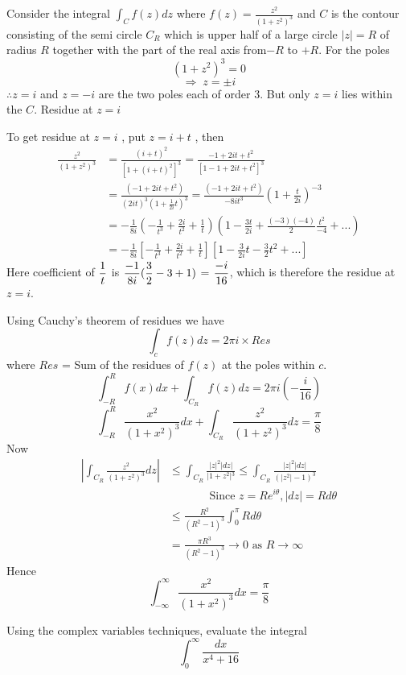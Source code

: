 \begin{solution}
Consider the integral $\int_{C}f(z)dz$ where $f(z)=\frac{z^{2}}{(1+z^{2})^{3}}$
and $C$ is the contour consisting of the semi circle $C_{R}$ which
is upper half of a large circle $|z|=R$ of radius $R$ together with
the part of the real axis from$-R$ to $+R$. For the poles 
\[(1+z^{2})^{3}=0\]
\[\Rightarrow\; z=\pm i\]
$\therefore z=i$ and $z=-i$ are the two poles each of order 3. But
only $z=i$ lies within the $C$. Residue at $z=i$

To get residue at $z=i$ , put $z=i+t$ , then 
\begin{align*}
\frac{z^{2}}{(1+z^{2})^{3}} & =\frac{(i+t)^{2}}{[1+(i+t)^{2}]^{3}}=\frac{-1+2it+t^{2}}{[1-1+2it+t^{2}]^{3}}\\
 & =\frac{(-1+2it+t^{2})}{(2it)^{3}(1+\frac{1}{2i}t)^{3}}=\frac{(-1+2it+t^{2})}{-8it^{3}}(1+\frac{t}{2i})^{-3}\\
 & =-\frac{1}{8i}\left(-\frac{1}{t^{3}}+\frac{2i}{t^{2}}+\frac{1}{t}\right)\left(1-\frac{3t}{2i}+\frac{(-3)(-4)}{2}\frac{t^{2}}{-4}+...\right)\\
 & =-\frac{1}{8i}\left[-\frac{1}{t^{3}}+\frac{2i}{t^{2}}+\frac{1}{t}\right]\left[1-\frac{3}{2i}t-\frac{3}{2}t^{2}+...\right]
 \end{align*}
Here coefficient of $\displaystyle \frac{1}{t}$ is $\displaystyle \frac{-1}{8i}(\frac{3}{2}-3+1)$ = $\displaystyle \frac{-i}{16}$, which is therefore the residue at $z=i$.

Using Cauchy's theorem of residues we have 
\[\int_{c}f(z)dz=2\pi i\times Res\]
where $Res$ = Sum of the residues of $f(z)$ at the poles within $c$.
\[\int_{-R}^{R}f(x)dx+\int_{C_{R}}f(z)dz=2\pi i(-\frac{i}{16})\]
\[\int_{-R}^{R}\frac{x^{2}}{(1+x^{2})^{3}}dx+\int_{C_{R}}\frac{z^{2}}{(1+z^{2})^{3}}dz=\frac{\pi}{8}\]
Now 
\begin{align*}
\left|\int_{C_{R}}\frac{z^{2}}{(1+z^{2})^{3}}dz\right| & \le\int_{C_{R}}\frac{\left|z\right|^{2}|dz|}{\left|1+z^{2}\right|{}^{3}}
  \le\int_{C_{R}}\frac{|z|^{2}|dz|}{\left(\left|z^{2}\right|-1\right)^{3}}\\
 & \;\;\;\;\;\;\;\;\;\;\;\;\;\text{Since }z=Re^{i\theta},|dz|=Rd\theta\\
 & \le\frac{R^{2}}{(R^{2}-1)^{3}}\int_{0}^{\pi}Rd\theta\\
 & =\frac{\pi R^{3}}{(R^{2}-1)^{3}}\rightarrow0\text{ as }R\rightarrow\infty\end{align*}
Hence
\[\int_{-\infty}^{\infty}\frac{x^{2}}{(1+x^{2})^{3}}dx=\frac{\pi}{8}\]
\end{solution}
\begin{example}
Using the complex variables techniques, evaluate the integral
\[\int_{0}^{\infty}\frac{dx}{x^{4}+16}\]
\end{example}
